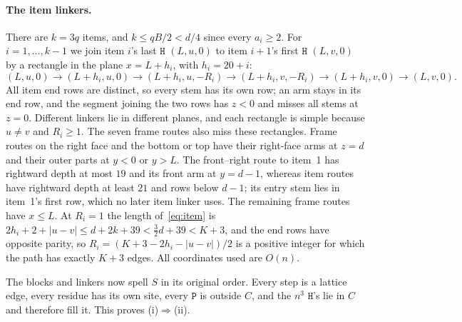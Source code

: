\documentclass[11pt,letterpaper]{article}
\theoremstyle{definition}
\theoremstyle{remark}
\newcommand{\Hh}{\mathtt{H}}
\newcommand{\Pp}{\mathtt{P}}
\begin{document}
\paragraph{The item linkers.}
There are $k=3q$ items, and $k\le qB/2<d/4$ since every $a_i\ge2$. For $i=1,\dots,k-1$ we join item
$i$'s last $\Hh$ $(L,u,0)$ to item $i+1$'s first $\Hh$ $(L,v,0)$ by a rectangle in the plane $x=L+h_i$,
with $h_i=20+i$:
\begin{equation}\label{eq:item}
(L,u,0)\to(L+h_i,u,0)\to(L+h_i,u,-R_i)\to(L+h_i,v,-R_i)\to(L+h_i,v,0)\to(L,v,0).
\end{equation}
All item end rows are distinct, so every stem has its own row; an arm stays in its end row, and the
segment joining the two rows has $z<0$ and misses all stems at $z=0$. Different linkers lie in
different planes, and each rectangle is simple because $u\ne v$ and $R_i\ge1$. The seven frame routes
also miss these rectangles. Frame routes on the right face and the bottom or top have their right-face
arms at $z=d$ and their outer parts at $y<0$ or $y>L$. The front--right route to item~1 has rightward
depth at most $19$ and its front arm at $y=d-1$, whereas item routes have rightward depth at least
$21$ and rows below $d-1$; its entry stem lies in item~1's first row, which no later item linker uses.
The remaining frame routes have $x\le L$. At $R_i=1$ the length of~\eqref{eq:item} is
$2h_i+2+|u-v|\le d+2k+39<\tfrac32 d+39<K+3$, and the end rows have opposite parity, so
$R_i=(K+3-2h_i-|u-v|)/2$ is a positive integer for which the path has exactly $K+3$ edges. All
coordinates used are $O(n)$.

The blocks and linkers now spell $S$ in its original order. Every step is a lattice edge, every
residue has its own site, every $\Pp$ is outside $C$, and the $n^3$ $\Hh$'s lie in $C$ and therefore fill
it. This proves (i)$\Rightarrow$(ii).
\end{document}
